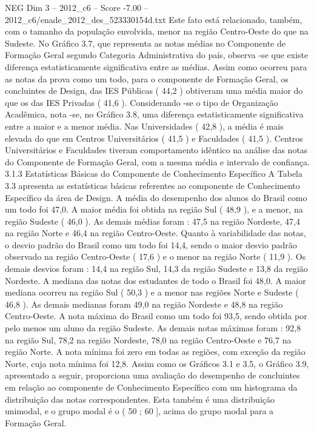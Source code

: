 \begin{textsample}{NEG Dim 3 – 2012\_c6 – Score -7.00 – 2012\_c6/enade\_2012\_des\_523330154d.txt}
Este fato está relacionado, também, com o tamanho da população envolvida, menor na região Centro-Oeste do que na Sudeste.
No Gráfico 3.7, que representa as notas médias no Componente de Formação Geral segundo Categoria Administrativa do país, observa -se que existe diferença estatisticamente significativa entre as médias.
Assim como ocorreu para as notas da prova como um todo, para o componente de Formação Geral, os concluintes de Design, das IES Públicas ( 44,2 ) obtiveram uma média maior do que os das IES Privadas ( 41,6 ).
Considerando -se o tipo de Organização Acadêmica, nota -se, no Gráfico 3.8, uma diferença estatisticamente significativa entre a maior e a menor média.
Nas Universidades ( 42,8 ), a média é mais elevada do que em Centros Universitários ( 41,5 ) e Faculdades ( 41,5 ).
Centros Universitários e Faculdades tiveram comportamento idêntico na análise das notas do Componente de Formação Geral, com a mesma média e intervalo de confiança. 3.1.3 Estatísticas Básicas do Componente de Conhecimento Específico A Tabela 3.3 apresenta as estatísticas básicas referentes ao componente de Conhecimento Específico da área de Design.
A média do desempenho dos alunos do Brasil como um todo foi 47,0.
A maior média foi obtida na região Sul ( 48,9 ), e a menor, na região Sudeste ( 46,0 ).
As demais médias foram : 47,5 na região Nordeste, 47,4 na região Norte e 46,4 na região Centro-Oeste.
Quanto à variabilidade das notas, o desvio padrão do Brasil como um todo foi 14,4, sendo o maior desvio padrão observado na região Centro-Oeste ( 17,6 ) e o menor na região Norte ( 11,9 ).
Os demais desvios foram : 14,4 na região Sul, 14,3 da região Sudeste e 13,8 da região Nordeste.
A mediana das notas dos estudantes de todo o Brasil foi 48,0.
A maior mediana ocorreu na região Sul ( 50,3 ) e a menor nas regiões Norte e Sudeste ( 46,8 ).
As demais medianas foram 49,0 na região Nordeste e 48,8 na região Centro-Oeste.
A nota máxima do Brasil como um todo foi 93,5, sendo obtida por pelo menos um aluno da região Sudeste.
As demais notas máximas foram : 92,8 na região Sul, 78,2 na região Nordeste, 78,0 na região Centro-Oeste e 76,7 na região Norte.
A nota mínima foi zero em todas as regiões, com exceção da região Norte, cuja nota mínima foi 12,8.
Assim como os Gráficos 3.1 e 3.5, o Gráfico 3.9, apresentado a seguir, proporciona uma avaliação do desempenho de concluintes em relação ao componente de Conhecimento Específico com um histograma da distribuição das notas correspondentes.
Esta também é uma distribuição unimodal, e o grupo modal é o ( 50 ; 60 ], acima do grupo modal para a Formação Geral.

\end{textsample}
